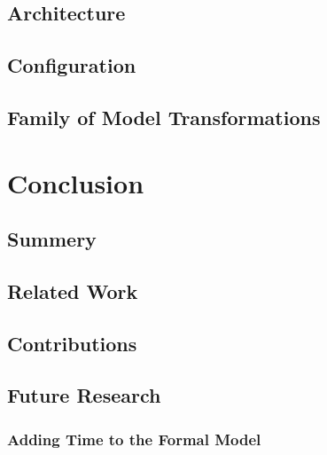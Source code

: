 \documentclass[english,ngerman,BCOR=6mm,cdgeometry=no,DIV=13,twoside,cdmath=false]{tudscrreprt}
\begin{document}
\section{Architecture}\label{architecture}

\section{Configuration}\label{configuration}

\section{Family of Model
Transformations}\label{family-of-model-transformations}

\chapter{Conclusion}\label{conclusion}

\section{Summery}\label{summery}

\section{Related Work}\label{related-work}

\section{Contributions}\label{contributions}

\section{Future Research}\label{future-research}

\subsection{Adding Time to the Formal
Model}\label{adding-time-to-the-formal-model}

\listoffigures

\listoftables

\lstlistoflistings

\printacronyms[sort,heading=chapter*,name=List of Abbreviations]

\nocite{*}
\renewcommand{\bibname}{References}


\end{document}

